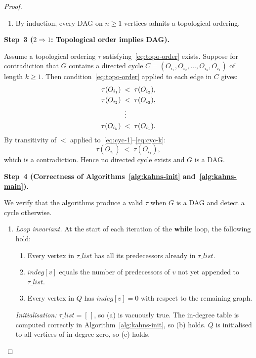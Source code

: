 \documentclass[12pt,openany]{book}
\numberwithin{equation}{chapter}
\theoremstyle{plain}
\theoremstyle{definition}
\theoremstyle{remark}
\numberwithin{equation}{chapter}
\theoremstyle{plain}
\begin{document}
\begin{proof}
\begin{enumerate}
  \item By induction, every DAG on $n \geq 1$ vertices admits a
        topological ordering.
\end{enumerate}

\medskip
\noindent\textbf{Step~3 ($2 \Rightarrow 1$: Topological order implies DAG).}

Assume a topological ordering $\tau$ satisfying~\eqref{eq:topo-order}
exists.  Suppose for contradiction that $G$ contains a directed cycle
$C = (O_{i_1}, O_{i_2}, \ldots, O_{i_k}, O_{i_1})$ of length $k \geq 1$.
Then condition~\eqref{eq:topo-order} applied to each edge in $C$ gives:
\begin{align}
  \tau(O_{i_1}) &\;<\; \tau(O_{i_2}), \label{eq:cyc-1}\\
  \tau(O_{i_2}) &\;<\; \tau(O_{i_3}), \label{eq:cyc-2}\\
                &\;\;\vdots \notag \\
  \tau(O_{i_k}) &\;<\; \tau(O_{i_1}). \label{eq:cyc-k}
\end{align}
By transitivity of $<$ applied to~\eqref{eq:cyc-1}--\eqref{eq:cyc-k}:
\begin{equation}
  \tau(O_{i_1}) \;<\; \tau(O_{i_1}),
  \label{eq:cyc-contradiction}
\end{equation}
which is a contradiction.  Hence no directed cycle exists and $G$ is a DAG.

\medskip
\noindent\textbf{Step~4 (Correctness of Algorithms~\ref{alg:kahns-init}
and~\ref{alg:kahns-main}).}

We verify that the algorithms produce a valid $\tau$ when $G$ is a DAG
and detect a cycle otherwise.

\begin{enumerate}
  \item \emph{Loop invariant.}
        At the start of each iteration of the \textbf{while} loop, the
        following hold:
        \begin{enumerate}
          \item Every vertex in $\tau\_list$ has all its predecessors
                already in $\tau\_list$.
          \item $\mathit{indeg}[v]$ equals the number of predecessors
                of $v$ not yet appended to $\tau\_list$.
          \item Every vertex in $Q$ has $\mathit{indeg}[v] = 0$
                with respect to the remaining graph.
        \end{enumerate}
        \emph{Initialisation:} $\tau\_list = [\,]$, so (a) is vacuously
        true.  The in-degree table is computed correctly in
        Algorithm~\ref{alg:kahns-init}, so (b) holds.  $Q$ is
        initialised to all vertices of in-degree zero, so (c) holds.


\end{enumerate}
\end{proof}
\end{document}
